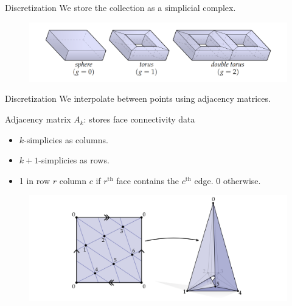 \documentclass[UKenglish]{beamer}
\begin{document}
\begin{frame}{Discretization}
    We store the collection as a simplicial complex.
    \vspace*{1.5cm}
    \begin{figure}
        \centering
        \includegraphics[width=.9\textwidth]{Figures/topological_surfaces.png}
    \end{figure}
\end{frame}

\begin{frame}{Discretization}
We interpolate between points using adjacency matrices.

\vspace*{.5cm}
Adjacency matrix $A_k$: stores face connectivity data
\begin{itemize}
    \item $k$-simplicies as columns.
    \item $k+1$-simplicies as rows.
    \item 1 in row $r$ column $c$ if $r^\mathrm{th}$ face contains the $c^\mathrm{th}$ edge. 0 otherwise.
\end{itemize}
\begin{figure}
    \centering
    \includegraphics[width=.7\textwidth]{Figures/simplicial_complex.png}
\end{figure}
\end{frame}
\end{document}
